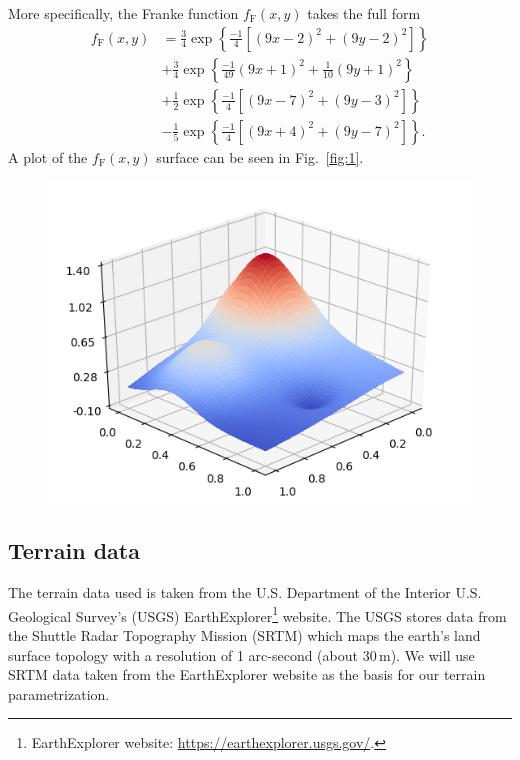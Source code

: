 \documentclass[a4paper, twocolumn]{article}
\newcommand{\fig}[1]{Fig.\ \ref{fig:#1}}
\begin{document}
More specifically, the Franke function $f_\text{F}(x,y)$ takes the full form
\begin{align}
f_\text{F}(x,y) &= \frac{3}{4}\exp\left\{\frac{-1}{4}\left[\left(9x-2\right)^2 + \left(9y-2\right)^2\right]\right\}\nonumber \\
&+ \frac{3}{4}\exp\left\{\frac{-1}{49}\left(9x+1\right)^2 + \frac{1}{10}\left(9y+1\right)^2\right\}\nonumber \\
&+ \frac{1}{2}\exp\left\{\frac{-1}{4}\left[\left(9x-7\right)^2 + \left(9y-3\right)^2\right]\right\}\nonumber \\
&- \frac{1}{5}\exp\left\{\frac{-1}{4}\left[\left(9x+4\right)^2 + \left(9y-7\right)^2\right]\right\}.
\end{align}
A plot of the $f_\text{F}(x,y)$ surface can be seen in \fig{1}.

\begin{figure}
\centering
\includegraphics[width=\linewidth]{franke.png}
\end{figure}

\subsection{Terrain data}
The terrain data used is taken from the U.S. Department of the Interior U.S. Geological Survey's (USGS) EarthExplorer\footnote{EarthExplorer website: \url{https://earthexplorer.usgs.gov/}.} website. The USGS stores data from the Shuttle Radar Topography Mission (SRTM) which maps the earth's land surface topology with a resolution of 1 arc-second (about $30\,\text{m}$). We will use SRTM data taken from the EarthExplorer website as the basis for our terrain parametrization.
\end{document}
